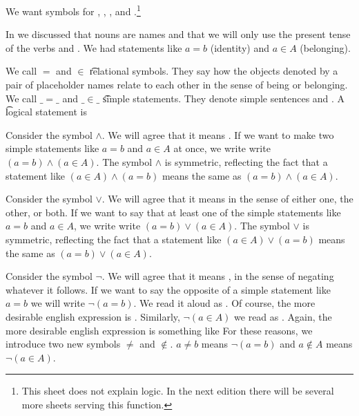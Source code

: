 

We want symbols for , , , and .\footnote{This sheet does not explain logic. In the next edition there will be several more sheets serving this function.}


In  we discussed that nouns are names and that we will only use the present tense of the verbs  and .
We had statements like ${a}={b}$ (identity) and $a \in A$ (belonging).

We call $=$ and $\in$ \t{relational symbols}.
They say how the objects denoted by a pair of placeholder names relate to each other in the sense of being or belonging.
We call $\_=\_$ and $\_\in\_$ \t{simple statements}.
They denote simple sentences  and .
A \t{logical statement} is



Consider the symbol $\land$.
We will agree that it means .
If we want to make two simple statements like $a = b$ and $a \in A$ at once, we write write $(a = b) \land (a \in A)$.
The symbol $\land$ is symmetric, reflecting the fact that a statement like $(a \in A) \land (a = b)$ means the same as $(a = b) \land (a \in A)$.


Consider the symbol $\lor$.
We will agree that it means  in the sense of either one, the other, or both.
If we want to say that  at least one of the simple statements like $a = b$ and $a \in A$, we write write $(a = b) \lor (a \in A)$.
The symbol $\lor$ is symmetric, reflecting the fact that a statement like $(a \in A) \lor (a = b)$ means the same as $(a = b) \lor (a \in A)$.


Consider the symbol $\neg$.
We will agree that it means , in the sense of negating whatever it follows.
If we want to say the opposite of a simple statement like $a = b$ we will write $\neg(a = b)$.
We read it aloud as .
Of course, the more desirable english expression is .
Similarly, $\neg(a \in A)$ we read as .
Again, the more desirable english expression is something like 
For these reasons, we introduce two new symbols $\neq$ and $\not\in$.
$a \neq b$ means $\neg(a = b)$ and $a \not\in A$ means $\neg(a \in A)$.

